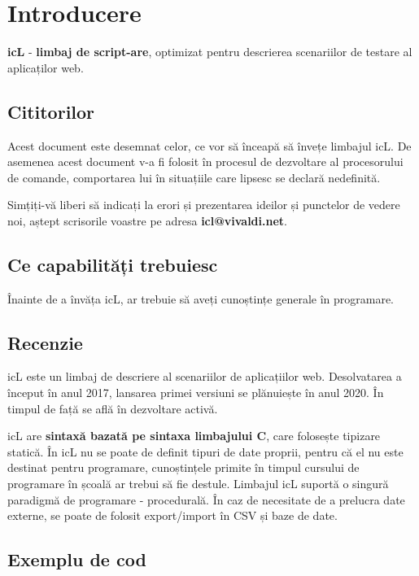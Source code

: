 \section{Introducere}

\indent \textbf{icL} - \textbf{limbaj de script-are}, optimizat pentru descrierea scenariilor de testare al aplicaților web.

\subsection{Cititorilor}

Acest document este desemnat celor, ce vor să înceapă să învețe limbajul icL. De asemenea acest document v-a fi folosit în procesul de dezvoltare al procesorului de comande, comportarea lui în situațiile care lipsesc se declară nedefinită.

Simțiți-vă liberi să indicați la erori și prezentarea ideilor și punctelor de vedere noi, aștept scrisorile voastre pe adresa {\bf icl@vivaldi.net}.

\subsection{Ce capabilități trebuiesc}

Înainte de a învăța icL, ar trebuie să aveți cunoștințe generale în programare.

\subsection{Recenzie}

icL este un limbaj de descriere al scenariilor de aplicațiilor web. Desolvatarea a început în anul 2017, lansarea primei versiuni se plănuiește în anul 2020. În timpul de față se află în dezvoltare activă.

icL are \textbf{sintaxă bazată pe sintaxa limbajului C}, care folosește tipizare statică. În icL nu se poate de definit tipuri de date proprii, pentru că el nu este destinat pentru programare, cunoștințele primite în timpul cursului de programare în școală ar trebui să fie destule. Limbajul icL suportă o singură paradigmă de programare - procedurală. În caz de necesitate de a prelucra date externe, se poate de folosit export/import în CSV și baze de date.

\subsection{Exemplu de cod}

